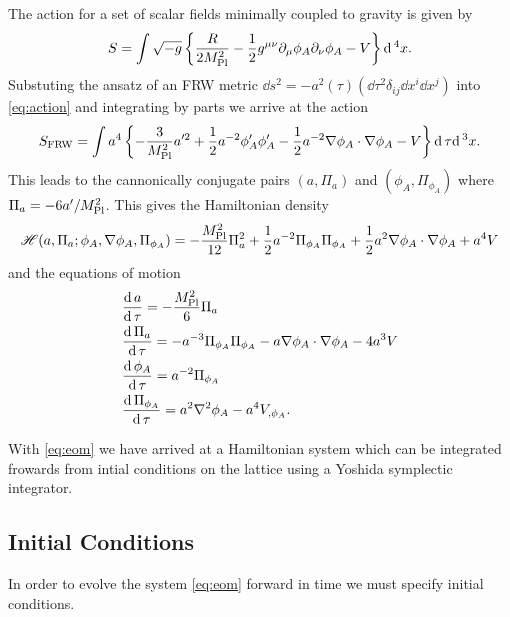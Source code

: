 The action for a set of scalar fields minimally coupled to gravity is given by
\begin{equation} \label{eq:action}
  S = \int \sqrt{-g}\left\{\frac{R}{2M_{\mathrm{Pl}}^2} - \frac{1}{2}g^{\mu\nu}\partial_\mu\phi_A\partial_\nu\phi_A - V \right\}\mathrm{d}\,^4x.
\end{equation} 
Substuting the ansatz of an FRW metric $\dd s^2 = -a^2(\tau)\left( \dd\tau^2 \delta_{ij}\dd x^i\dd x^j \right)$ into \eqref{eq:action} and integrating by parts we arrive at the action
\begin{equation} \label{eq:actionFRW}
  S_{\mathrm{FRW}} = \int a^4\left\{
  - \frac{3}{M_{\mathrm{Pl}}^2}a'^2
  + \frac{1}{2}a^{-2}\phi_A'\phi_A'
  - \frac{1}{2}a^{-2}\nabla\phi_A\cdot\nabla\phi_A
  - V
  \right\}\mathrm{d}\,\tau\mathrm{d}\,^3x.
\end{equation}
This leads to the cannonically conjugate pairs $(a,\Pi_a)$ and $(\phi_A,\Pi_{\phi_A})$ where $\Pi_a = -6a'/M_{\mathrm{Pl}}^2$. This gives the Hamiltonian density
\begin{equation} \label{eq:hamiltonian}
  \mathscr{H}(a,\Pi_a; \phi_A,\nabla\phi_A,\Pi_{\phi_A}) =
  - \frac{M_{\mathrm{Pl}}^2}{12}\Pi_a^2
  + \frac{1}{2}a^{-2}\Pi_{\phi_A}\Pi_{\phi_A}
  + \frac{1}{2}a^2\nabla\phi_A\cdot\nabla\phi_A
  + a^4V
\end{equation}
and the equations of motion
\begin{align} \label{eq:eom}
  &\frac{\mathrm{d}\, a}{\mathrm{d}\,\tau} = -\frac{M_{\mathrm{Pl}}^2}{6}\Pi_a \\
  &\frac{\mathrm{d}\,\Pi_a}{\mathrm{d}\,\tau}  = -a^{-3}\Pi_{\phi_A}\Pi_{\phi_A} - a\nabla\phi_A\cdot\nabla\phi_A -4a^3V \\
  &\frac{\mathrm{d}\,\phi_A}{\mathrm{d}\,\tau}  = a^{-2}\Pi_{\phi_A} \\
  &\frac{\mathrm{d}\,\Pi_{\phi_A}}{\mathrm{d}\,\tau}  = a^2\nabla^2\phi_A - a^4V_{,\phi_A}.
\end{align}

With \eqref{eq:eom} we have arrived at a Hamiltonian system which can be integrated frowards from intial conditions on the lattice using a Yoshida symplectic integrator.

\subsection{Initial Conditions}
In order to evolve the system \eqref{eq:eom} forward in time we must specify initial conditions.
% 

